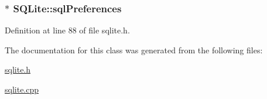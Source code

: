 \hypertarget{classSQLite_a2dd6672e754497ad5ad90470e3ef3e33}{
\subsubsection[{sql\-Preferences}]{$\ast$ {\bf \-S\-Q\-Lite\-::sql\-Preferences}}}\label{classSQLite_a2dd6672e754497ad5ad90470e3ef3e33}


\-Definition at line 88 of file sqlite.\-h.



\-The documentation for this class was generated from the following files\-:\begin{DoxyCompactItemize}
\item 
\hyperlink{sqlite_8h}{sqlite.\-h}\item 
\hyperlink{sqlite_8cpp}{sqlite.\-cpp}\end{DoxyCompactItemize}
